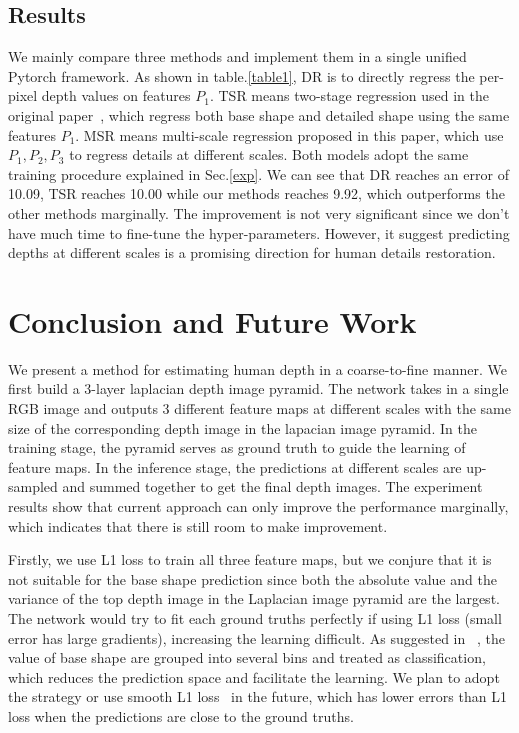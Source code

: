 \documentclass{article} %
\begin{document}
\subsection{Results}
We mainly compare three methods and implement them in a single unified Pytorch framework. As shown in table.\ref{table1}, DR is to directly regress the per-pixel depth values on features $P_1$. TSR means two-stage regression used in the original paper~\cite{tang2019neural}, which regress both base shape and detailed shape using the same features $P_1$. MSR means multi-scale regression proposed in this paper, which use  $P_1,P_2,P_3$ to regress details at different scales. Both models adopt the same training procedure explained in Sec.\ref{exp}. We can see that DR reaches an error of 10.09, TSR reaches 10.00 while our methods reaches 9.92, which outperforms the other methods marginally. The improvement is not very significant since we don't have much time to fine-tune the hyper-parameters. However, it suggest predicting depths at different scales is a promising direction for human details restoration. 

\section{Conclusion and Future Work}
We present a method for estimating human depth in a coarse-to-fine manner. We first build a 3-layer laplacian depth image pyramid. The network takes in a single RGB image and outputs 3 different feature maps at different scales with the same size of the corresponding depth image in the lapacian image pyramid. In the training stage, the pyramid serves as ground truth to guide the learning of feature maps. In the inference stage, the predictions at different scales are up-sampled and summed together to get the final depth images. The experiment results show that current approach can only improve the performance marginally, which indicates that there is still room to make improvement. 

Firstly, we use L1 loss to train all three feature maps, but we conjure that it is not suitable for the base shape prediction since both the absolute value and the variance of the top depth image in the Laplacian image pyramid are the largest. The network would try to fit each ground truths perfectly if using L1 loss (small error has large gradients), increasing the learning difficult. As suggested in ~\cite{tang2019neural}, the value of base shape are grouped into several bins and treated as classification, which reduces the prediction space and facilitate the learning. We plan to adopt the strategy or use smooth L1 loss~\cite{girshick2014rich} in the future, which has lower errors than L1 loss when the predictions are close to the ground truths.
\end{document}
